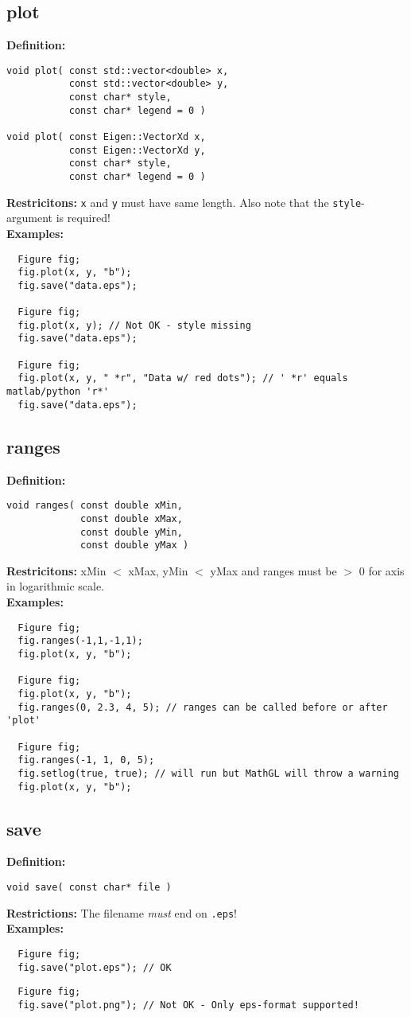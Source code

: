 \documentclass[a4paper]{article}
\newcommand{\command}[1]{\subsection{#1}}
\begin{document}
\command{plot} 

\textbf{Definition:} 
\begin{lstlisting}
void plot( const std::vector<double> x, 
           const std::vector<double> y, 
           const char* style, 
           const char* legend = 0 ) 

void plot( const Eigen::VectorXd x, 
           const Eigen::VectorXd y, 
           const char* style, 
           const char* legend = 0 )
\end{lstlisting}
\textbf{Restricitons:} \texttt{x} and \texttt{y} must have same length. Also note that the \texttt{style}-argument is required! \\
%
\textbf{Examples:}
\begin{lstlisting}
  Figure fig;
  fig.plot(x, y, "b");
  fig.save("data.eps");

  Figure fig;
  fig.plot(x, y); // Not OK - style missing
  fig.save("data.eps");

  Figure fig;
  fig.plot(x, y, " *r", "Data w/ red dots"); // ' *r' equals matlab/python 'r*'
  fig.save("data.eps");
\end{lstlisting}

\command{ranges}

\textbf{Definition:}
\begin{lstlisting}
void ranges( const double xMin, 
             const double xMax, 
             const double yMin, 
             const double yMax )
\end{lstlisting}
%
\textbf{Restricitons:} xMin $<$ xMax, yMin $<$ yMax and ranges must be $>$ 0 for axis in logarithmic scale. \\
%
\textbf{Examples:}
\begin{lstlisting}
  Figure fig;
  fig.ranges(-1,1,-1,1);
  fig.plot(x, y, "b");

  Figure fig;
  fig.plot(x, y, "b");
  fig.ranges(0, 2.3, 4, 5); // ranges can be called before or after 'plot'

  Figure fig;
  fig.ranges(-1, 1, 0, 5);
  fig.setlog(true, true); // will run but MathGL will throw a warning 
  fig.plot(x, y, "b");
\end{lstlisting}

\command{save}

\textbf{Definition:}
\begin{lstlisting}
void save( const char* file )
\end{lstlisting}
%
\textbf{Restrictions:} The filename \textit{must} end on \texttt{.eps}! \\
%
\textbf{Examples:}
\begin{lstlisting}
  Figure fig;
  fig.save("plot.eps"); // OK
\end{lstlisting}
\begin{lstlisting}
  Figure fig;
  fig.save("plot.png"); // Not OK - Only eps-format supported!
\end{lstlisting}
\end{document}
